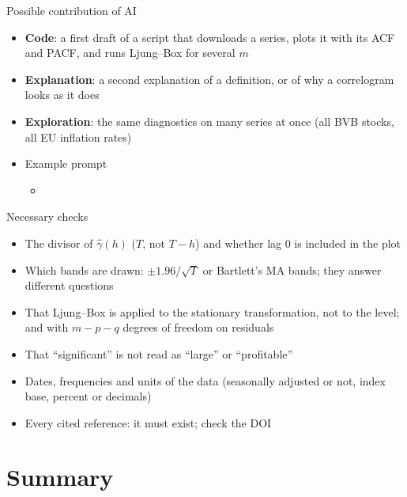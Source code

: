 \begin{frame}{Possible contribution of AI}
\itemsize{\small}
\begin{itemize}
    \item \textbf{Code}: a first draft of a script that downloads a series, plots it with its ACF and PACF, and runs Ljung--Box for several $m$
    \item \textbf{Explanation}: a second explanation of a definition, or of why a correlogram looks as it does
    \item \textbf{Exploration}: the same diagnostics on many series at once (all BVB stocks, all EU inflation rates)
    \item Example prompt
    \begin{itemize}
        \item {}
    \end{itemize}
\end{itemize}
\end{frame}

\begin{frame}{Necessary checks}
\itemsize{\small}
\begin{itemize}
    \item The divisor of $\hat\gamma(h)$ ($T$, not $T - h$) and whether lag 0 is included in the plot
    \item Which bands are drawn: $\pm 1.96/\sqrt{T}$ or Bartlett's MA bands; they answer different questions
    \item That Ljung--Box is applied to the stationary transformation, not to the level; and with $m - p - q$ degrees of freedom on residuals
    \item That ``significant'' is not read as ``large'' or ``profitable''
    \item Dates, frequencies and units of the data (seasonally adjusted or not, index base, percent or decimals)
    \item Every cited reference: it must exist; check the DOI
\end{itemize}
\end{frame}


\section{Summary}


